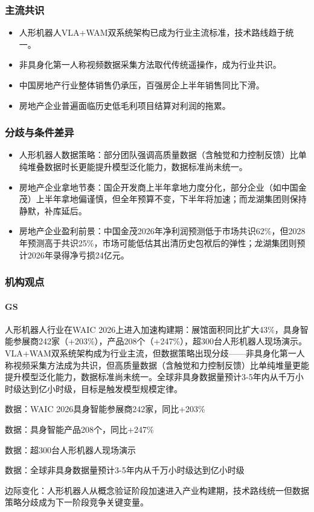 \documentclass[11pt]{ctexart}
\begin{document}
\subsubsection*{主流共识}
\begin{itemize}
  \item 人形机器人VLA+WAM双系统架构已成为行业主流标准，技术路线趋于统一。
  \item 非具身化第一人称视频数据采集方法取代传统遥操作，成为行业共识。
  \item 中国房地产行业整体销售仍承压，百强房企上半年销售同比下滑。
  \item 房地产企业普遍面临历史低毛利项目结算对利润的拖累。
\end{itemize}
\subsubsection*{分歧与条件差异}
\begin{itemize}
  \item 人形机器人数据策略：部分团队强调高质量数据（含触觉和力控制反馈）比单纯堆叠数据时长更能提升模型泛化能力，数据标准尚未统一。
  \item 房地产企业拿地节奏：国企开发商上半年拿地力度分化，部分企业（如中国金茂）上半年拿地偏谨慎，但全年预算不变，下半年将加速；而龙湖集团则保持静默，补库延后。
  \item 房地产企业盈利前景：中国金茂2026年净利润预测低于市场共识62\%，但2028年预测高于共识25\%，市场可能低估其出清历史包袱后的弹性；龙湖集团则预计2026年录得净亏损24亿元。
\end{itemize}
\subsubsection*{机构观点}
\paragraph{GS} 人形机器人行业在WAIC 2026上进入加速构建期：展馆面积同比扩大43\%，具身智能参展商242家（+203\%），产品208个（+247\%），超300台人形机器人现场演示。VLA+WAM双系统架构成为行业主流，但数据策略出现分歧——非具身化第一人称视频采集方法成为共识，但高质量数据（含触觉和力控制反馈）比单纯堆量更能提升模型泛化能力，数据标准尚未统一。全球非具身数据量预计3-5年内从千万小时级达到亿小时级，目标是触发模型规模定律。
{\small\color{refgray}数据：WAIC 2026具身智能参展商242家，同比+203\%\par}
{\small\color{refgray}数据：具身智能产品208个，同比+247\%\par}
{\small\color{refgray}数据：超300台人形机器人现场演示\par}
{\small\color{refgray}数据：全球非具身数据量预计3-5年内从千万小时级达到亿小时级\par}
{\small\color{refgray}边际变化：人形机器人从概念验证阶段加速进入产业构建期，技术路线统一但数据策略分歧成为下一阶段竞争关键变量。\par}
\end{document}
